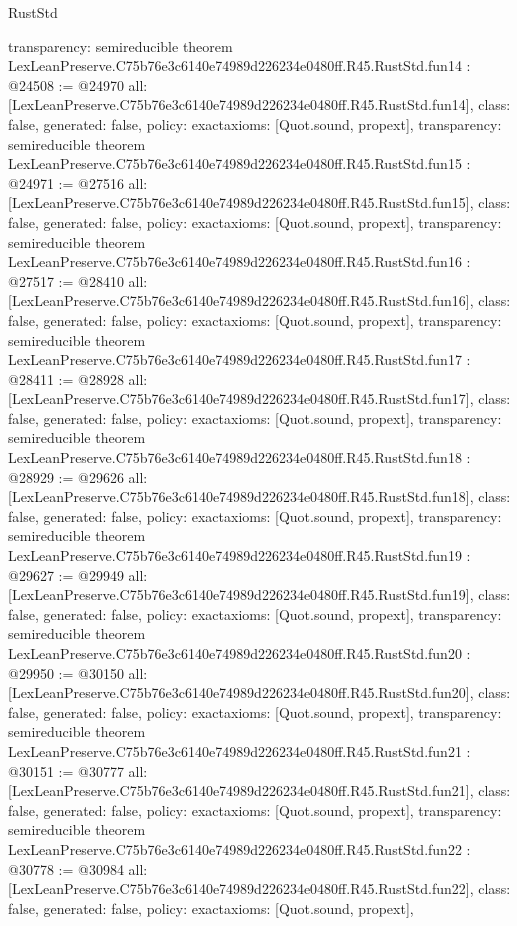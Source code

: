 \begin{lexlean}{RustStd}
\begin{coremodule}
{  transparency: semireducible
}
theorem LexLeanPreserve.C75b76e3c6140e74989d226234e0480ff.R45.RustStd.fun14 : @24508 := @24970 {
  all: [LexLeanPreserve.C75b76e3c6140e74989d226234e0480ff.R45.RustStd.fun14],
  class: false,
  generated: false,
  policy: exact{axioms: [Quot.sound, propext]},
  transparency: semireducible
}
theorem LexLeanPreserve.C75b76e3c6140e74989d226234e0480ff.R45.RustStd.fun15 : @24971 := @27516 {
  all: [LexLeanPreserve.C75b76e3c6140e74989d226234e0480ff.R45.RustStd.fun15],
  class: false,
  generated: false,
  policy: exact{axioms: [Quot.sound, propext]},
  transparency: semireducible
}
theorem LexLeanPreserve.C75b76e3c6140e74989d226234e0480ff.R45.RustStd.fun16 : @27517 := @28410 {
  all: [LexLeanPreserve.C75b76e3c6140e74989d226234e0480ff.R45.RustStd.fun16],
  class: false,
  generated: false,
  policy: exact{axioms: [Quot.sound, propext]},
  transparency: semireducible
}
theorem LexLeanPreserve.C75b76e3c6140e74989d226234e0480ff.R45.RustStd.fun17 : @28411 := @28928 {
  all: [LexLeanPreserve.C75b76e3c6140e74989d226234e0480ff.R45.RustStd.fun17],
  class: false,
  generated: false,
  policy: exact{axioms: [Quot.sound, propext]},
  transparency: semireducible
}
theorem LexLeanPreserve.C75b76e3c6140e74989d226234e0480ff.R45.RustStd.fun18 : @28929 := @29626 {
  all: [LexLeanPreserve.C75b76e3c6140e74989d226234e0480ff.R45.RustStd.fun18],
  class: false,
  generated: false,
  policy: exact{axioms: [Quot.sound, propext]},
  transparency: semireducible
}
theorem LexLeanPreserve.C75b76e3c6140e74989d226234e0480ff.R45.RustStd.fun19 : @29627 := @29949 {
  all: [LexLeanPreserve.C75b76e3c6140e74989d226234e0480ff.R45.RustStd.fun19],
  class: false,
  generated: false,
  policy: exact{axioms: [Quot.sound, propext]},
  transparency: semireducible
}
theorem LexLeanPreserve.C75b76e3c6140e74989d226234e0480ff.R45.RustStd.fun20 : @29950 := @30150 {
  all: [LexLeanPreserve.C75b76e3c6140e74989d226234e0480ff.R45.RustStd.fun20],
  class: false,
  generated: false,
  policy: exact{axioms: [Quot.sound, propext]},
  transparency: semireducible
}
theorem LexLeanPreserve.C75b76e3c6140e74989d226234e0480ff.R45.RustStd.fun21 : @30151 := @30777 {
  all: [LexLeanPreserve.C75b76e3c6140e74989d226234e0480ff.R45.RustStd.fun21],
  class: false,
  generated: false,
  policy: exact{axioms: [Quot.sound, propext]},
  transparency: semireducible
}
theorem LexLeanPreserve.C75b76e3c6140e74989d226234e0480ff.R45.RustStd.fun22 : @30778 := @30984 {
  all: [LexLeanPreserve.C75b76e3c6140e74989d226234e0480ff.R45.RustStd.fun22],
  class: false,
  generated: false,
  policy: exact{axioms: [Quot.sound, propext]},
}
\end{coremodule}
\end{lexlean}
